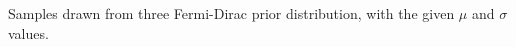 \label{fig:priorfermidirac}
Samples drawn from three Fermi-Dirac prior distribution, with the given $\mu$ and $\sigma$ values.
